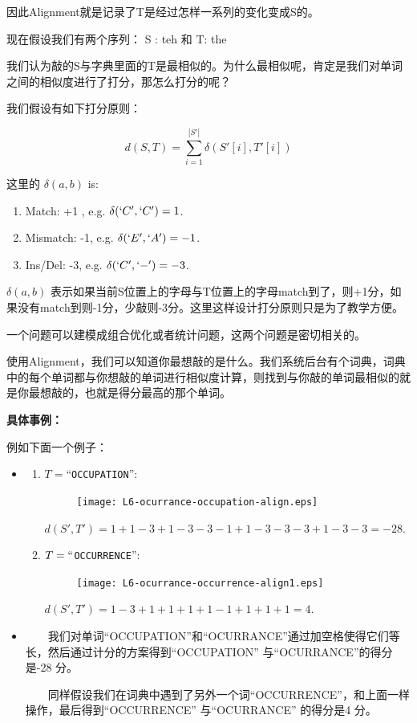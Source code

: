因此Alignment就是记录了T是经过怎样一系列的变化变成S的。

现在假设我们有两个序列： S : teh 和 T: the

我们认为敲的S与字典里面的T是最相似的。为什么最相似呢，肯定是我们对单词之间的相似度进行了打分，那怎么打分的呢？

我们假设有如下打分原则：

\[
d(S,T)=\sum_{i=1}^{|S'|} \delta( S'[i], T'[i] )
\]

这里的 $\delta(a,b)$ is:
\begin{enumerate}
 \item Match: +1 , e.g.  $\delta(`C', `C') = 1$.\\
 \item Mismatch: -1, e.g.  $\delta(`E', `A') = -1$.\\
 \item Ins/Del: -3, e.g.  $\delta(`C', `-') = -3$.\\
\end{enumerate}

$\delta(a,b)$ 表示如果当前S位置上的字母与T位置上的字母match到了，则+1分，如果没有match到则-1分，少敲则-3分。这里这样设计打分原则只是为了教学方便。

一个问题可以建模成组合优化或者统计问题，这两个问题是密切相关的。

使用Alignment，我们可以知道你最想敲的是什么。我们系统后台有个词典，词典中的每个单词都与你想敲的单词进行相似度计算，则找到与你敲的单词最相似的就是你最想敲的，也就是得分最高的那个单词。

\textbf{
具体事例：}

例如下面一个例子：

\begin{itemize}
\item 
\begin{enumerate}
\item $T=$``\texttt{OCCUPATION}'':
\begin{figure}
	\texttt{[image: L6-ocurrance-occupation-align.eps]}
\end{figure}
$d(S',T') = 1+1-3+1-3-3-1+1-3-3-3+1-3-3 = -28$.
\item $T=``$\texttt{OCCURRENCE}'':
\begin{figure}
	\texttt{[image: L6-ocurrance-occurrence-align1.eps]}
\end{figure}
$d(S',T') = 1-3+1+1+1+1-1+1+1+1 =4$.
\end{enumerate}
\item
\begin{flushleft}
    ~~~~我们对单词“OCCUPATION”和“OCURRANCE”通过加空格使得它们等长，然后通过计分的方案得到“OCCUPATION” 与“OCURRANCE”的得分是-28 分。
    \end{flushleft}

    \begin{flushleft}
    ~~~~同样假设我们在词典中遇到了另外一个词“OCCURRENCE”，和上面一样操作，最后得到“OCCURRENCE” 与“OCURRANCE” 的得分是4 分。
    \end{flushleft}
\end{itemize}


